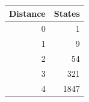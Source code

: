 \begin{tabular}{rr}
\hline
Distance & States \\
\hline
0 & 1 \\
1 & 9 \\
2 & 54 \\
3 & 321 \\
4 & 1847 \\
\hline
\end{tabular}
